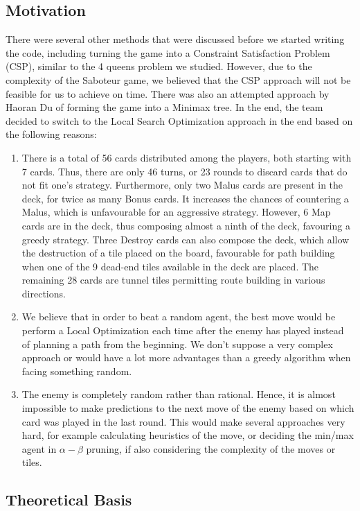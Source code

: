 \documentclass[12pt,twoside,letterpaper]{article}
\begin{document}
\subsection{Motivation}
There were several other methods that were discussed before we started writing the code, including turning the game into a Constraint Satisfaction Problem (CSP), similar to the 4 queens problem we studied. However, due to the complexity of the Saboteur game, we believed that the CSP approach will not be feasible for us to achieve on time. There was also an attempted approach by Haoran Du of forming the game into a Minimax tree. In the end, the team decided to switch to the Local Search Optimization approach in the end based on the following reasons:
\begin{enumerate}
  \item There is a total of 56 cards distributed among the players, both starting with 7 cards. Thus, there are only 46 turns, or 23 rounds to discard cards that do not fit one's strategy. Furthermore, only two Malus cards are present in the deck, for twice as many Bonus cards. It increases the chances of countering a Malus, which is unfavourable for an aggressive strategy. However, 6 Map cards are in the deck, thus composing almost a ninth of the deck, favouring a greedy strategy. Three Destroy cards can also compose the deck, which allow the destruction of a tile placed on the board, favourable for path building when one of the 9 dead-end tiles available in the deck are placed. The remaining 28 cards are tunnel tiles permitting route building in various directions.
  \item We believe that in order to beat a random agent, the best move would be perform a Local Optimization each time after the enemy has played instead of planning a path from the beginning. We don't suppose a very complex approach or would have a lot more advantages than a greedy algorithm when facing something random.
  \item The enemy is completely random rather than rational. Hence, it is almost impossible to make predictions to the next move of the enemy based on which card was played in the last round. This would make several approaches very hard, for example calculating heuristics of the move, or deciding the min/max agent in $\alpha - \beta$ pruning, if also considering the complexity of the moves or tiles.
\end{enumerate}
\subsection{Theoretical Basis}
\end{document}
